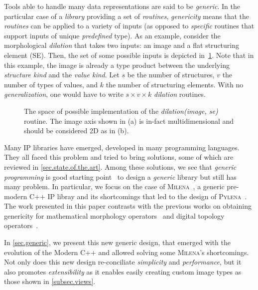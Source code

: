 Tools able to handle many data representations are said to be
\emph{generic}. In the particular case of a \emph{library} providing a
set of \emph{routines}, \emph{genericity} means that the \emph{routines}
can be applied to a variety of inputs (as opposed to \emph{specific}
routines that support inputs of unique \emph{predefined} type). As an
example, consider the morphological \emph{dilation} that takes two
inputs: an image and a flat structuring element (SE). Then, the set of
some possible inputs is depicted in~\cref{fig.espaceSAV}. Note that in
this example, the image is already a type product between the
underlying \emph{structure kind} and the \emph{value kind}. Let $s$ be
the number of structures, $v$ the number of types of values, and $k$
the number of structuring elements. With no \emph{generalization}, one
would have to write $s \times v \times k$ \emph{dilation} routines.

\begin{figure}[tbp]
  \centering
  \subcaptionbox{}{}
  \subcaptionbox{}{}
  \caption{The space of possible implementation of the \emph{dilation(image, se)}
    routine. The image axis shown in (a) is in-fact multidimensional and should
    be considered 2D as in (b).}
  \label{fig.espaceSAV}
\end{figure}

Many IP libraries have emerged, developed in many programming
languages. They all faced this problem and tried to bring solutions,
some of which are reviewed in \cref{sec.state.of.the.art}. Among these
solutions, we see that \emph{generic programming} is good starting
point~\cite{geraud.2000.icpr} to design a \emph{generic} library but
still has many problem. In particular, we focus on the case of
\textsc{Milena}~\cite{levillain.2010.icip, geraud2012ipolmeeting}, a generic 
pre-modern C++ IP libray and its shortcomings that led to the design of 
\textsc{Pylena}~\cite{carlinet2018pylena}.  The work presented in this paper 
contrasts with the previous works on obtaining genericity for mathematical 
morphology operators~\cite{darbon.2002.ismm,levillain.2009.ismm} and digital 
topology operators~\cite{levillain.2012.wadgmm}.

In \cref{sec.generic}, we present this new generic design, that emerged with the
evolution of the Modern C++ and allowed solving some \textsc{Milena}'s
shortcomings. Not only does this new design re-conciliate \emph{simplicity} and
\emph{performance}, but it also promotes \emph{extensibility} as it enables
easily creating custom image types as those shown in \cref{subsec.views}.




